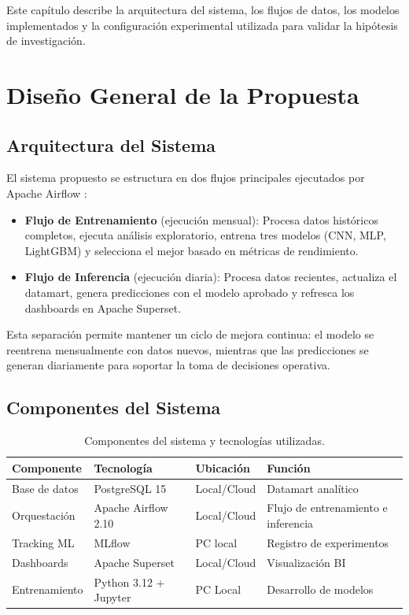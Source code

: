 Este capítulo describe la arquitectura del sistema, los flujos de datos, los modelos implementados y la configuración experimental utilizada para validar la hipótesis de investigación.

\section{Diseño General de la Propuesta}

\subsection{Arquitectura del Sistema}

El sistema propuesto se estructura en dos flujos principales ejecutados por Apache Airflow \cite{apache2024airflow}:

\begin{itemize}
    \item \textbf{Flujo de Entrenamiento} (ejecución mensual): Procesa datos históricos completos, ejecuta análisis exploratorio, entrena tres modelos (CNN, MLP, LightGBM) y selecciona el mejor basado en métricas de rendimiento.
    \item \textbf{Flujo de Inferencia} (ejecución diaria): Procesa datos recientes, actualiza el datamart, genera predicciones con el modelo aprobado y refresca los dashboards en Apache Superset.
\end{itemize}

Esta separación permite mantener un ciclo de mejora continua: el modelo se reentrena mensualmente con datos nuevos, mientras que las predicciones se generan diariamente para soportar la toma de decisiones operativa.

\subsection{Componentes del Sistema}

\begin{table}[h!]
\centering
\begin{tabular}{|l|l|l|l|}
\hline
\textbf{Componente} & \textbf{Tecnología} & \textbf{Ubicación} & \textbf{Función} \\
\hline
Base de datos & PostgreSQL 15 \cite{postgresql2024documentation} & Local/Cloud & Datamart analítico \\
\hline
Orquestación & Apache Airflow 2.10 \cite{apache2024airflow} & Local/Cloud & Flujo de entrenamiento e inferencia \\
\hline
Tracking ML & MLflow \cite{mlflow2024documentation} & PC local & Registro de experimentos \\
\hline
Dashboards & Apache Superset \cite{apache2024superset} & Local/Cloud & Visualización BI \\
\hline
Entrenamiento & Python 3.12 + Jupyter & PC Local & Desarrollo de modelos \\
\hline
\end{tabular}
\caption{Componentes del sistema y tecnologías utilizadas.}
\label{tab:componentes}
\end{table}

